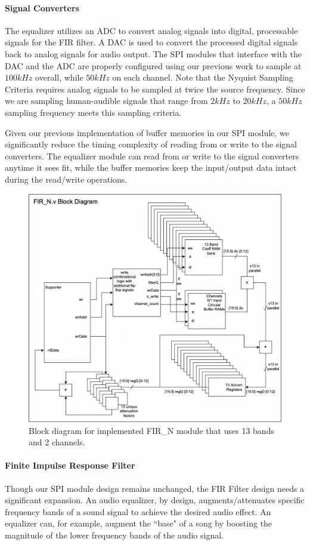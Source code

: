 \documentclass[journal]{IEEEtran} %
\begin{document}
\paragraph{Signal Converters} The equalizer utilizes an ADC to convert analog signals into digital, processable signals for the FIR filter. A DAC is used to convert the processed digital signals back to analog signals for audio output. The SPI modules that interface with the DAC and the ADC are properly configured using our previous work to sample at $100kHz$ overall, while $50kHz$ on each channel. Note that the Nyquist Sampling Criteria requires analog signals to be sampled at twice the source frequency. Since we are sampling human-audible signals that range from $2kHz$ to $20kHz$, a $50kHz$ sampling frequency meets this sampling criteria. 

Given our previous implementation of buffer memories in our SPI module, we significantly reduce the timing complexity of reading from or write to the signal converters. The equalizer module can read from or write to the signal converters anytime it sees fit, while the buffer memories keep the input/output data intact during the read/write operations.

\begin{figure}[t]
    \centering
    \includegraphics[width=0.7\linewidth]{Figures/EQ/fir_block.png}
    \caption{Block diagram for implemented FIR\_N module that uses 13 bands and 2 channels.}
    \label{fig:FIR_BLOCK}
\end{figure}

\paragraph{Finite Impulse Response Filter}
Though our SPI module design remains unchanged, the FIR Filter design needs a significant expansion. An audio equalizer, by design, augments/attenuates specific frequency bands of a sound signal to achieve the desired audio effect. An equalizer can, for example, augment the ``base" of a song by boosting the magnitude of the lower frequency bands of the audio signal. 
\end{document}
